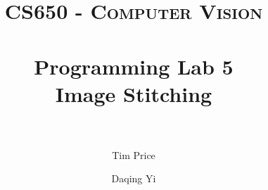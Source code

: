 \documentclass[paper=a4, fontsize=11pt]{scrartcl}
\title{
		\usefont{OT1}{bch}{b}{n}
		\normalfont \normalsize \textsc{CS650 - Computer Vision} \\ [25pt]
		\horrule{0.5pt} \\[0.4cm]
		\huge Programming Lab 5 \\ Image Stitching \\
		\horrule{2pt} \\[0.5cm]
}
\author{
		\normalfont %
        Tim Price \and Daqing Yi \\
}
\begin{document}
\maketitle

\begin{comment}
Step 1: Calculate Homography 
 high-contrast corners (Manual)
Step 2: Warp images
 backward mapping method (bilinear interpolation)
 
Extra credits:
(1) stitch the images by using a simple blending of them
(2) Use linear regression (more than four points)
(3) Use RANSAC (support bad point matches)
(4) Find points automatically using point detectors
\end{comment}

\begin{comment}
(1) GUI
Create GUI framework (DQ)
File loading (Tim)
Image displaying (DQ)
(2) Homography
Four point algorithm
(3) Warp
(3.1)Display a warped polygon
(3.2)Fill pixels using billinear interpolation
(4) Blending
(4.1) Average
(4.2) Weighted average
(5) Linear Regression
(6) RANSAC
\end{comment}






\end{document}

